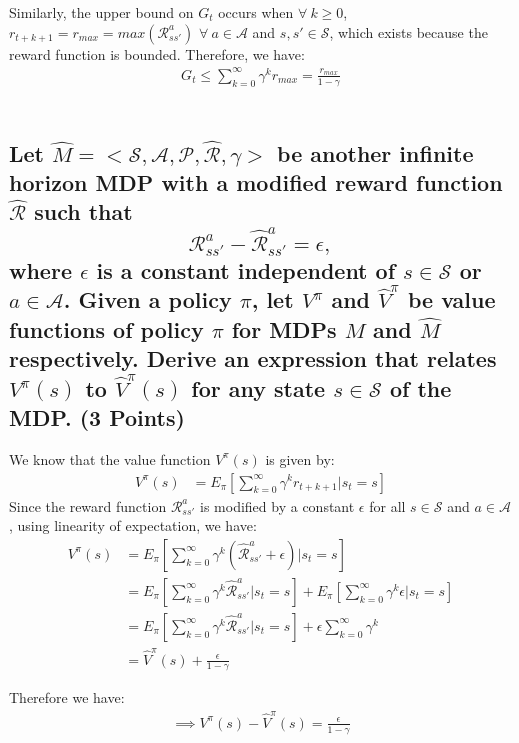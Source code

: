 \documentclass{article}
\renewcommand{\S}{\mathcal{S}}
\newcommand{\A}{\mathcal{A}}
\renewcommand{\P}{\mathcal{P}}
\newcommand{\R}{\mathcal{R}}
\newcommand{\Rhat}{\hat{\mathcal{R}}}
\begin{document}
\pagebreak
\noindent
Similarly, the upper bound on $G_t$ occurs when $\forall \ k \geq 0$, $r_{t+k+1} = r_{max} = max(\R^a_{ss'})$ $\forall \ a \in \A$ and $s, s' \in \S$, which exists because the reward function is bounded. Therefore, we have:
\begin{align}
	\boxed{G_t \leq \sum_{k=0}^\infty \gamma^k r_{max} = \frac{r_{max}}{1 - \gamma} }	
\end{align}
\,

\subsection{Let $\hat{M} = < \S, \A, \P, \Rhat, \gamma >$ be another infinite horizon MDP with a modified reward function $\Rhat$ such that $$\R^a_{ss'} - \Rhat^a_{ss'} = \epsilon,$$ where $\epsilon$ is a constant independent of $s \in \S$ or $a \in \A$. Given a policy $\pi$, let $V^\pi$ and $ \hat{V}^\pi$ be value functions of policy $\pi$ for MDPs $M$ and $\hat{M}$ respectively. Derive an expression that relates $V^\pi (s)$ to $\hat{V}^\pi (s)$ for any state $s \in \S$ of the MDP. (3 Points)}

We know that the value function $V^\pi(s)$ is given by:
\begin{align}
	V^\pi(s) &= E_\pi \left[ \sum_{k=0}^\infty \gamma^k r_{t+k+1} \bigg| s_t = s \right]
\end{align}
Since the reward function $\R^a_{ss'}$ is modified by a constant $\epsilon$ for all $s \in \S$ and $a \in \A$, using linearity of expectation, we have:
\begin{align}
	V^\pi(s) &= E_\pi \left[ \sum_{k=0}^\infty \gamma^k \left( \Rhat^a_{ss'} + \epsilon \right) \bigg| s_t = s \right] \\
	&= E_\pi \left[ \sum_{k=0}^\infty \gamma^k \Rhat^a_{ss'} \bigg| s_t = s \right] + E_\pi \left[ \sum_{k=0}^\infty \gamma^k \epsilon \bigg| s_t = s \right] \\
	&= E_\pi \left[ \sum_{k=0}^\infty \gamma^k \Rhat^a_{ss'} \bigg| s_t = s \right] + \epsilon \sum_{k=0}^\infty \gamma^k \\
	&= \hat{V}^\pi(s) + \frac{\epsilon}{1 - \gamma}
\end{align}

\noindent
Therefore we have:
\begin{align}
	\boxed{\implies V^\pi(s) - \hat{V}^\pi(s) = \frac{\epsilon}{1 - \gamma}}
\end{align}

\,

\end{document}
